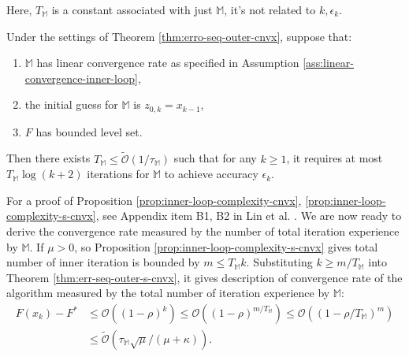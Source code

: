 \documentclass[12pt]{article}
\begin{document}
            \begin{remark}
                Here, $T_{\mathbb M}$ is a constant associated with just $\mathbb M$, it's not related to $k, \epsilon_k$. 
            \end{remark}
            \begin{proposition}\label{prop:inner-loop-complexity-cnvx}
                Under the settings of Theorem \ref{thm:erro-seq-outer-cnvx}, suppose that:
                \begin{enumerate}
                    \item $\mathbb M$ has linear convergence rate as specified in Assumption \ref{ass:linear-convergence-inner-loop}, 
                    \item the initial guess for $\mathbb M$ is $z_{0, k} = x_{k - 1}$, 
                    \item $F$ has bounded level set.
                \end{enumerate}
                Then there exists $T_{\mathbb M} \le \widetilde{\mathcal O}(1 / \tau_{\mathbb M})$ such that for any $k \ge 1$, it requires at most\\ $T_{\mathbb M}\log(k + 2)$ iterations for $\mathbb M$ to achieve accuracy $\epsilon_k$.    
            \end{proposition}
            For a proof of Proposition \ref{prop:inner-loop-complexity-cnvx}, \ref{prop:inner-loop-complexity-s-cnvx}, see Appendix item B1, B2 in Lin et al. \cite{lin_universal_2015}. 
            We are now ready to derive the convergence rate measured by the number of total iteration experience by $\mathbb M$. 
            If $\mu > 0$, so Proposition \ref{prop:inner-loop-complexity-s-cnvx} gives total number of inner iteration is bounded by $m \le T_{\mathbb M}k$. 
            Substituting $k \ge m/T_{\mathbb M}$ into Theorem \ref{thm:err-seq-outer-s-cnvx}, it gives description of convergence rate of the algorithm measured by the total number of iteration experience by $\mathbb M$: 
            \begin{align*}
                F(x_k) - F^* &\le \mathcal O \left(
                    (1 - \rho)^k 
                \right) \le 
                \mathcal O \left(
                    (1 - \rho)^{m/ T_{\mathbb M}}
                \right) \le 
                \mathcal O\left(
                    \left(1 - \rho/T_{\mathbb M}\right)^{m}
                \right)
                \\
                &\le \widetilde{\mathcal O}\left(
                    \tau_{\mathbb M}\sqrt{\mu}/(\mu + \kappa)
                \right). 
            \end{align*}
\end{document}

